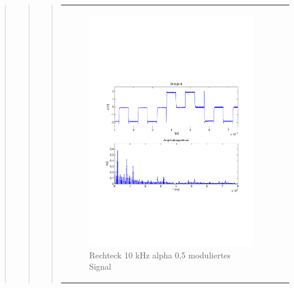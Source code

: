 \begin{quote}
\begin{quote}
\begin{quote}
\begin{center}
\begin{tabular}{ll}
            \hspace{-5cm}
                \begin{minipage}{0.6\textwidth}
                    \begin{figure}[H]
                        \includegraphics[scale=0.55, trim = 16mm 70mm 16mm 85mm, clip]{Bilder/flatrec10_05abget_zeit}
                          \caption{Rechteck 10 kHz alpha 0,5 moduliertes Signal}
		                  \label{fig:flatrec10_05zeit}
                    \end{figure}
                \end{minipage}
                

\end{tabular}
\end{center}
\end{quote}
\end{quote}
\end{quote}

